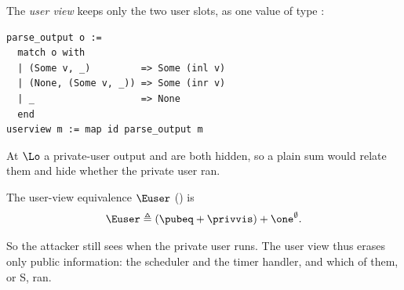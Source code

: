 The \emph{user view} keeps only the two user slots, as one
value of type :
\begin{lstlisting}
parse_output o :=
  match o with
  | (Some v, _)         => Some (inl v)
  | (None, (Some v, _)) => Some (inr v)
  | _                   => None
  end
userview m := map id parse_output m
\end{lstlisting}

At $\Lo$ a private-user output and  are both hidden, so a plain sum
would relate them and hide whether the private user ran. 

\begin{definition}\label{def:userview}
The user-view equivalence $\Euser$ () is
\[
\Euser \triangleq (\pubeq + \privvis) + \one^\emptyset.
\]
\end{definition}

So the attacker still sees when the private user runs. The user view thus erases only public
information: the scheduler and the timer handler, and which of them, or S, ran.

